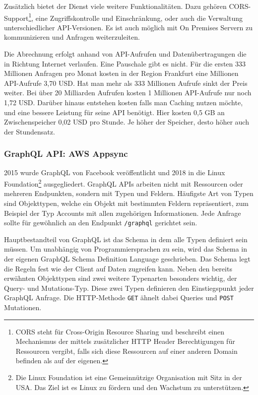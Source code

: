 Zusätzlich bietet der Dienst viele weitere Funktionalitäten. Dazu gehören CORS-Support\footnote{CORS steht für Cross-Origin Resource Sharing und
beschreibt einen Mechanismus der mittels zusätzlicher HTTP Header Berechtigungen für Ressourcen vergibt, falls sich diese Ressourcen auf einer anderen
Domain befinden als auf der eigenen.}, eine Zugriffskontrolle und Einschränkung, oder auch die Verwaltung unterschiedlicher
API-Versionen. Es ist auch möglich mit On Premises Servern zu kommunizieren und Anfragen weiterzuleiten.\cite[]{APIGateway}

Die Abrechnung erfolgt anhand von API-Aufrufen und Datenübertragungen die in Richtung Internet verlaufen. Eine Pauschale gibt es nicht.
Für die ersten 333 Millionen Anfragen pro Monat kosten in der Region Frankfurt eine Millionen API-Aufrufe 3,70 USD. Hat man mehr als 333 Millionen
Aufrufe sinkt der Preis weiter. Bei über 20 Milliarden Aufrufen kosten 1 Millionen API-Aufrufe nur noch 1,72 USD.
Darüber hinaus entstehen kosten falls man Caching nutzen möchte, und eine bessere Leistung für seine API benötigt. Hier kosten 0,5 GB an Zwischenspeicher
0,02 USD pro Stunde. Je höher der Speicher, desto höher auch der Stundensatz.
\cite[]{APIGWPrice}

\subsubsection{GraphQL API: AWS Appsync}

2015 wurde GraphQL von Facebook veröffentlicht und 2018 in die Linux Foundation\footnote{Die Linux Foundation ist eine Gemeinnützige Organisation mit Sitz in der USA.
Das Ziel ist es Linux zu fördern und den Wachstum zu unterstützen.} ausgegliedert.
GraphQL APIs arbeiten nicht mit Ressourcen oder mehreren Endpunkten, sondern mit Typen und Feldern.
Häufigste Art von Typen sind Objekttypen, welche ein Objekt mit bestimmten Feldern repräsentiert, zum Beispiel der Typ Accounts mit allen zugehörigen Informationen.
Jede Anfrage sollte für gewöhnlich an den Endpunkt \verb+/graphql+ gerichtet sein.

Hauptbestandteil von GraphQL ist das Schema in dem alle Typen definiert sein müssen.
Um unabhängig von Programmiersprachen zu sein, wird das Schema in der eigenen GraphQL Schema Definition Language geschrieben.
Das Schema legt die Regeln fest wie der Client auf Daten zugreifen kann.
Neben den bereits erwähnten Objekttypen sind zwei weitere Typenarten besonders wichtig, der Query- und Mutations-Typ.
Diese zwei Typen definieren den Einstiegspunkt jeder GraphQL Anfrage.
Die HTTP-Methode \verb+GET+ ähnelt dabei Queries und \verb+POST+ Mutationen. \cite[]{GraphQL1}

